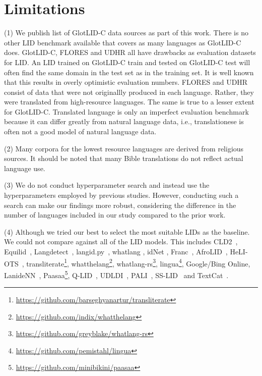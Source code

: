 \documentclass[11pt]{article}
\def\corpusname{\mbox{GlotLID-C}\xspace}
\def\flores{FLORES\xspace}
\def\udhr{UDHR\xspace}
\begin{document}
\newpage

\section*{Limitations}

(1) We publish list of \corpusname data sources 
as part of this work. There is no other LID benchmark available that
covers as many languages as \corpusname does. \corpusname,
\flores and \udhr all have drawbacks as evaluation datasets
for LID. An LID trained on \corpusname train and tested
on \corpusname test will often find the same domain in the
test set as in the training set. It is well known that this
results in overly optimistic evaluation numbers.
\flores and \udhr consist of data that were not originallly
produced in each language.
Rather, they were translated from
high-resource languages.
The same is true to a lesser extent for \corpusname.
Translated language is only an
imperfect evaluation benchmark because it can differ greatly
from natural language data, i.e., translationese is
often not a good model of  natural language data.


(2) Many corpora for the lowest resource languages are
derived from religious sources. It should be noted that many
Bible translations do not reflect actual language use.


(3) We do not conduct hyperparameter search and instead use the hyperparameters employed by previous studies. However, conducting such a search can make our findings more robust, considering the difference in the number of languages included in our study compared to the prior work. 


(4) Although we tried our best to select the most suitable LIDs as the baseline. We could not compare against all of the LID models. This includes CLD2~\citep{mccandless2010accuracy},
Equilid~\citep{jurgens-etal-2017-incorporating}, 
Langdetect~\citep{shuyo2010language},
langid.py~\citep{lui-baldwin-2012-langid}, whatlang \citep{brown-2014-non, la-strings}, idNet
\citep{dunn2020mapping}, Franc~\citep{franc}, AfroLID~\citep{adebara-etal-2022-afrolid}, 
HeLI-OTS~\citep{jauhiainen-etal-2022-heli},
transliterate\footnote{\url{https://github.com/barseghyanartur/transliterate}}, whatthelang\footnote{\url{https://github.com/indix/whatthelang}}, whatlang-rs\footnote{\url{https://github.com/greyblake/whatlang-rs}}, lingua\footnote{\url{https://github.com/pemistahl/lingua}}, Google/Bing Online, LanideNN~\cite{kocmi-bojar-2017-lanidenn}, Paasaa\footnote{\url{https://github.com/minibikini/paasaa}}, Q-LID~\cite{ren-etal-2022-effective}, UDLDI~\cite{goswami-etal-2020-unsupervised}, PALI~\cite{ahmadi-etal-2023-pali}, SS-LID~\citep{caswell-etal-2020-language, bapna2022building, kudugunta2023madlad}
and
TextCat~\citep{cavnar1994n}.
\end{document}
